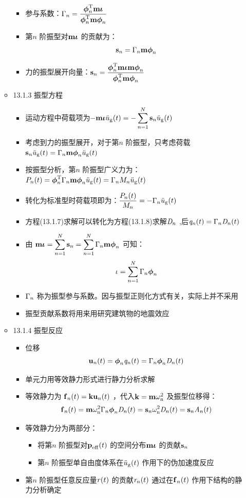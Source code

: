 \documentclass[11pt]{article}
\begin{document}
\begin{itemize}
\begin{itemize}
\begin{itemize}
\item 参与系数：\(\Gamman = \dfrac{\vphint \vm \viota }{\vphint \vm \vphin}\)
\item 第\(n\) 阶振型对\(\vm \viota\) 的贡献为：$$\vsn = \Gamman \vm \vphin$$
\item 力的振型展开向量：\(\vsn = \dfrac{\vphint \vm \viota \vm \vphin}{\vphint \vm \vphin}\)
\end{itemize}
\item 13.1.3 振型方程
\label{sec:org75ed0b3}
\begin{itemize}
\item 运动方程中荷载项为\(-\vm \viota \ddugt = - \sumn \vsn \ddugt\)
\item 考虑到力的振型展开，对于第\(n\) 阶振型，只考虑荷载 \(\vsn \ddugt = \Gamman \vm \vphin \ddugt\)
\item 按振型分析，第\(n\) 阶振型广义力为：\(\Pnt=\vphint \Gamman \vm \vphin \ddugt = \Gamman M_{n} \ddugt\)
\item 转化为标准型时荷载项即为：\(\dfrac{\Pnt}{M_{n}} = - \Gamman \ddugt\)
\item 方程(13.1.7)求解可以转化为方程(13.1.8)求解\(\Dn\) ,后\(\qnt=\Gamman \Dnt\)
\item 由 
\(\vm\viota=\sumn \vsn = \sumn \Gamman \vm \vphin\) 可知：$$\iota = \sumn \Gamman \vphin$$
\item \(\Gamman\) 称为振型参与系数。因与振型正则化方式有关，实际上并不采用
\item 振型贡献系数将用来用研究建筑物的地震效应
\end{itemize}
\item 13.1.4 振型反应
\label{sec:org920daf4}
\begin{itemize}
\item 位移 $$\vunt=\vphin \qnt = \Gamman \vphin \Dnt$$
\item 单元力用等效静力形式进行静力分析求解
\item 等效静力为 \(\vfnt = \vk \vunt\) ，代入\(\vk= \vm \omegann\) 及振型位移得：
$$\vfnt =  \vm \omegann \Gamman \vphin \Dnt = \vsn \omegann \Dnt = \vsn \Ant $$
\item 等效静力分为两部分：
\begin{itemize}
\item 将第\(n\) 阶振型对\(\vpefft\) 的空间分布\(\vm\viota\) 的贡献\(\vsn\)
\item 第\(n\) 阶振型单自由度体系在\(\ddugt\) 作用下的伪加速度反应
\end{itemize}
\item 第\(n\) 阶振型任意反应量\(\rt\) 的贡献\(\rnt\) 通过在\(\vfnt\) 作用下结构的静力分析确定

\end{itemize}
\end{itemize}
\end{itemize}
\end{document}
